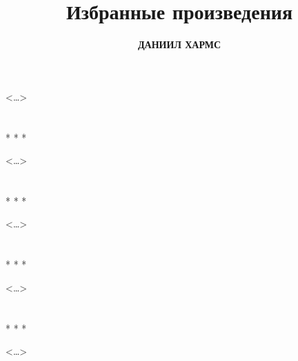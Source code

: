 \documentclass[a4paper, 10pt]{article}
\title{Избранные произведения}
\author{\textbf{ДАНИИЛ ХАРМС}}
\date{}
\begin{document}
\maketitle


\section*{}

\begin{flushright}
    <\dots>
\end{flushright}


\section*{}
\begin{center}
    * * *
\end{center}



\begin{flushright}
    <\dots>
\end{flushright}


\section*{}
\begin{center}
    * * *
\end{center}

\begin{flushright}
    <\dots>
\end{flushright}

\section*{}
\begin{center}
    * * *
\end{center}

\begin{flushright}
    <\dots>
\end{flushright}

\section*{}
\begin{center}
    * * *
\end{center}

\begin{center}
    
\end{center}

\begin{flushright}
    <\dots>
\end{flushright}
\end{document}
